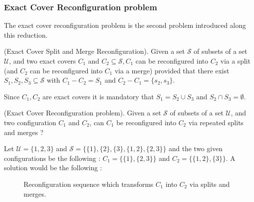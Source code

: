 \subsubsection{Exact Cover Reconfiguration problem} \label{subsubsection:Exact_cover}
The exact cover reconfiguration problem is the second problem introduced along this reduction.
\begin{defn}{(Exact Cover Split and Merge Reconfiguration).} Given a set $\mathcal{S}$ of subsets of a set $\mathcal{U}$, and two exact covers
$C_1$ and $C_2 \subseteq \mathcal{S}, C_1$ can be reconfigured into $C_2$ via a split (and $C_2$ can be reconfigured into $C_1$ via a merge)
provided that there exist $S_1, S_2, S_3 \subseteq \mathcal{S}$ with $C_1 - C_2 = S_1$ and $C_2 - C_1 = \{s_2, s_3\}$.

Since $C_1, C_2$ are exact covers it is mandatory that $S_1 = S_2 \cup S_3$ and $ S_2 \cap S_3 = \emptyset$.
\end{defn}

\begin{defn}{(Exact Cover Reconfiguration problem).} Given a set $\mathcal{S}$ of subsets of a set $\mathcal{U}$, and two configuration $C_1$ and $C_2$, can $C_1$
be reconfigured into $C_2$ via repeated splits and merges ?
\end{defn}

\begin{example}
Let $\mathcal{U} = \{1,2,3\}$ and $\mathcal{S} = \{\{1\}, \{2\}, \{3\}, \{1,2\}, \{2,3\}\}$ and the two given configurations be the
following : $C_1 = \{\{1\}, \{2,3\}\}$ and $C_2 = \{\{1,2\}, \{3\}\}$. A solution would be the following :

\begin{figure}[h!]
\begin{center}
\begin{scaletikzpicturetowidth}{\textwidth}
\end{scaletikzpicturetowidth}
\end{center}
\caption{Reconfiguration sequence which transforms $C_1$ into $C_2$ via splits and merges.}\label{fig:exact_cover}
\end{figure}
\end{example}

